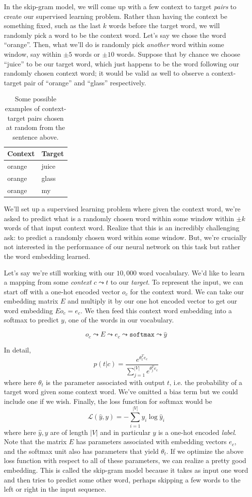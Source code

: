 \documentclass[12pt]{article}
\begin{document}
In the skip-gram model, we will come up with a few context to target \emph{pairs} to create our supervised learning problem. Rather than having the context be something fixed, such as the last $k$ words before the target word,
we will randomly pick a word to be the context word. Let's say we chose the word ``orange''. Then, what we'll do is randomly pick \emph{another} word within some window, say within $\pm 5$ words or $\pm 10$ words. Suppose that by chance we choose ``juice'' to be our target word, which just happens to be the word following our randomly chosen context word; it would be valid as well to observe a context-target pair of ``orange'' and ``glass'' respectively.
\begin{table}
  \centering
  \begin{tabular}{l l}
    Context & Target \\
    \hline
    orange & juice \\
    orange & glass \\
    orange & my
  \end{tabular}
  \caption{\footnotesize Some possible examples of context-target pairs chosen at random from the sentence above.} 
\end{table}
We'll set up a supervised learning problem where given the context word, we're asked to predict what is a randomly chosen word within some window within $\pm k$ words of that input context word. Realize that this is an incredibly challenging ask: to predict a randomly chosen word within some window. But, we're crucially not interested in the performance of our neural network on this task but rather the word embedding learned.

Let's say we're still working with our $10,000$ word vocabulary. We'd like to learn a mapping from some \emph{context} $c \leadsto t$ to our \emph{target}.
To represent the input, we can start off with a one-hot encoded vector $o_c$ for the context word. We can take our embedding matrix $E$ and multiply it by our one hot encoded vector to get our word embedding $E o_c = e_c$. We then feed this context word embedding into a softmax to predict $\hat y$, one of the words in our vocabulary. 

\[
  o_c \leadsto E \leadsto e_c \leadsto \texttt{softmax} \leadsto \hat y
\]

In detail,
\[
  p(t|c) = \frac{e^{\theta_t^T e_c}}{\sum_{j=1}^{|V|} e^{\theta_j^T e_c}}
\]
where here $\theta_t$ is the parameter associated with output $t$, i.e. the probability of a target word given some context word. We've omitted a bias term but we could include one if we wish. Finally, the loss function for softmax would be
\[
  \mathcal L (\hat y, y) = -\sum_{i=1}^{|V|} y_i \log \hat y_i
\]
where here $\hat y, y$ are of length $|V|$ and in particular $y$ is a one-hot encoded \emph{label}. Note that the matrix $E$ has parameters associated with embedding vectors $e_c$, and the softmax unit also has parameters that yield $\theta_t$. If we optimize the above loss function with respect to all of these parameters, we can realize a pretty good embedding.
This is called the skip-gram model because it takes as input one word and then tries to predict some other word, perhaps skipping a few words to the left or right in the input sequence.
\end{document}
